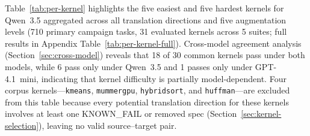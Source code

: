 \documentclass{article}
\begin{document}
Table~\ref{tab:per-kernel} highlights the five easiest and five hardest kernels for Qwen~3.5 aggregated across all translation directions and five augmentation levels (710 primary campaign tasks, 31 evaluated kernels across 5 suites; full results in Appendix Table~\ref{tab:per-kernel-full}). Cross-model agreement analysis (Section~\ref{sec:cross-model}) reveals that 18 of 30 common kernels pass under both models, while 6 pass only under Qwen~3.5 and 1 passes only under GPT-4.1~mini, indicating that kernel difficulty is partially model-dependent. %
Four corpus kernels---\texttt{kmeans}, \texttt{mummergpu}, \texttt{hybridsort}, and \texttt{huffman}---are excluded from this table because every potential translation direction for these kernels involves at least one KNOWN\_FAIL or removed spec (Section~\ref{sec:kernel-selection}), leaving no valid source--target pair.
\end{document}
